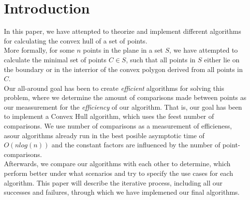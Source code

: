 \section{Introduction}

In this paper, we have attenpted to theorize and implement different algorithms for calculating the convex hull of a set of points.\\
More formally, for some $n$ points in the plane in a set $S$, we have attempted to calculate the minimal set of points $C \in S$, such that all points in $S$ either lie on the boundary or in the interrior of the convex polygon derived from all points in $C$.\\
Our all-around goal has been to create \textit{efficient} algorithms for solving this problem, where we determine the amount of comparisons made between points as our meassurement for the \textit{efficiency} of our algorithm. That is, our goal has been to implement a Convex Hull algorithm, which uses the feest number
of comparisons. We use number of comparisons as a measurement of efficieness, asour algorithms already run in the best posible asymptotic time of $O(nlog(n))$ and the constant factors are influenced by the number of point-comparisons. \\
Afterwards, we compare our algorithms with each other to determine, which perform better under what scenarios and try to specify the use cases for each algorithm.
This paper will describe the iterative process, including all our successes and failures, through which we have implemened our final algorithms.

